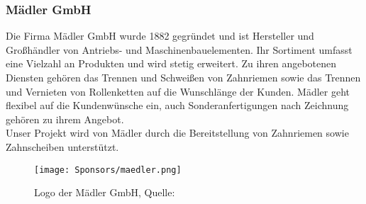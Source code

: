 \subsubsection{Mädler GmbH}
Die Firma Mädler GmbH wurde 1882 gegründet und ist Hersteller und Großhändler von Antriebs- und Maschinenbauelementen. Ihr Sortiment umfasst eine Vielzahl an Produkten und wird stetig erweitert. Zu ihren angebotenen Diensten gehören das Trennen und Schweißen von Zahnriemen sowie das Trennen und Vernieten von Rollenketten auf die Wunschlänge der Kunden. Mädler geht flexibel auf die Kundenwünsche ein, auch Sonderanfertigungen nach Zeichnung gehören zu ihrem Angebot.\cite{mädler}\\
Unser Projekt wird von Mädler durch die Bereitstellung von Zahnriemen sowie Zahnscheiben unterstützt.

\begin{figure}[H]
    \centering
    \texttt{[image: Sponsors/maedler.png]}
    \caption{Logo der Mädler GmbH, Quelle: \cite{maedler_logo}}
    \label{fig:maedler_logo}
\end{figure}


